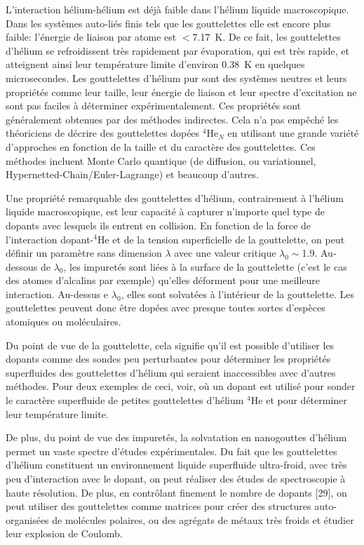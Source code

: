 		L'interaction hélium-hélium est déjà faible dans l'hélium liquide macroscopique. 
		Dans les systèmes auto-liés finis tels que les gouttelettes elle est encore plus faible:  l'énergie de liaison par atome est $<$7.17~K. 
		De ce fait, les gouttelettes d'hélium se refroidissent très rapidement par évaporation, qui est très rapide, et atteignent ainsi leur température limite d'environ 0.38~K en quelques microsecondes. 
		Les gouttelettes d'hélium pur sont des systèmes neutres et leurs propriétés comme leur taille, leur énergie de liaison et leur spectre d'excitation ne sont pas faciles à déterminer expérimentalement.
		Ces propriétés sont généralement obtenues par des méthodes indirectes.
	   Cela n'a pas empêché les théoriciens de décrire des gouttelettes dopées $^4$He$_N$ en utilisant une grande variété d'approches en fonction de la taille et du caractère des gouttelettes.
	   Ces méthodes incluent  Monte Carlo quantique (de diffusion, ou variationnel\citep{Gartner2018}, Hypernetted-Chain/Euler-Lagrange\citep{Krotscheck2001}) et beaucoup d'autres.

		Une propriété remarquable des gouttelettes d'hélium, contrairement à l'hélium liquide macroscopique, est leur capacité à capturer n'importe quel type de dopants avec lesquels ils entrent en collision. 
		En fonction de la force de l'interaction dopant-$^4$He et de la tension superficielle de la gouttelette, on peut définir un paramètre sans dimension $\lambda$\citep{Anc95} avec une valeur critique $\lambda_0\!\!\sim$1.9. 
		Au-dessous de $\lambda_0$, les impuretés sont liées à la surface de la gouttelette (c'est le cas des atomes d'alcalins par exemple) qu'elles déforment pour une meilleure interaction.
		 Au-dessus e $\lambda_0$, elles sont solvatées à l'intérieur de la gouttelette. 
		 Les gouttelettes peuvent donc être dopées avec presque toutes sortes d'espèces atomiques ou moléculaires.

		Du point de vue de la gouttelette, cela signifie qu'il est possible d'utiliser les dopants comme des sondes peu perturbantes pour déterminer les propriétés superfluides des gouttelettes d'hélium qui seraient inaccessibles avec d'autres méthodes. 
		Pour deux exemples de ceci, voir, où un dopant est utilisé pour sonder le caractère superfluide de petites gouttelettes d'hélium $^4$He et pour déterminer leur température limite.
		
		De plus, du point de vue des impuretés, la solvatation en nanogouttes d'hélium permet un vaste spectre d'études expérimentales. 
		Du fait que les gouttelettes d'hélium constituent un environnement liquide superfluide ultra-froid, avec très peu d'interaction avec le dopant, on peut réaliser des études de spectroscopie à haute résolution. 
		De plus, en contrôlant finement le nombre de dopants [29], on peut utiliser des gouttelettes comme matrices pour créer des structures auto-organisées de molécules polaires, ou des agrégats de métaux très froids et étudier leur explosion de Coulomb.

